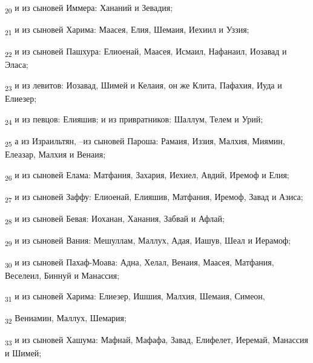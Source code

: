 \begin{tcolorbox}
\textsubscript{20} и из сыновей Иммера: Хананий и Зевадия;
\end{tcolorbox}
\begin{tcolorbox}
\textsubscript{21} и из сыновей Харима: Маасея, Елия, Шемаия, Иехиил и Уззия;
\end{tcolorbox}
\begin{tcolorbox}
\textsubscript{22} и из сыновей Пашхура: Елиоенай, Маасея, Исмаил, Нафанаил, Иозавад и Эласа;
\end{tcolorbox}
\begin{tcolorbox}
\textsubscript{23} и из левитов: Иозавад, Шимей и Келаия, он же Клита, Пафахия, Иуда и Елиезер;
\end{tcolorbox}
\begin{tcolorbox}
\textsubscript{24} и из певцов: Елияшив; и из привратников: Шаллум, Телем и Урий;
\end{tcolorbox}
\begin{tcolorbox}
\textsubscript{25} а из Израильтян, --из сыновей Пароша: Рамаия, Иззия, Малхия, Миямин, Елеазар, Малхия и Венаия;
\end{tcolorbox}
\begin{tcolorbox}
\textsubscript{26} и из сыновей Елама: Матфания, Захария, Иехиел, Авдий, Иремоф и Елия;
\end{tcolorbox}
\begin{tcolorbox}
\textsubscript{27} и из сыновей Заффу: Елиоенай, Елияшив, Матфания, Иремоф, Завад и Азиса;
\end{tcolorbox}
\begin{tcolorbox}
\textsubscript{28} и из сыновей Бевая: Иоханан, Ханания, Забвай и Афлай;
\end{tcolorbox}
\begin{tcolorbox}
\textsubscript{29} и из сыновей Вания: Мешуллам, Маллух, Адая, Иашув, Шеал и Иерамоф;
\end{tcolorbox}
\begin{tcolorbox}
\textsubscript{30} и из сыновей Пахаф-Моава: Адна, Хелал, Венаия, Маасея, Матфания, Веселеил, Биннуй и Манассия;
\end{tcolorbox}
\begin{tcolorbox}
\textsubscript{31} и из сыновей Харима: Елиезер, Ишшия, Малхия, Шемаия, Симеон,
\end{tcolorbox}
\begin{tcolorbox}
\textsubscript{32} Вениамин, Маллух, Шемария;
\end{tcolorbox}
\begin{tcolorbox}
\textsubscript{33} и из сыновей Хашума: Мафнай, Мафафа, Завад, Елифелет, Иеремай, Манассия и Шимей;
\end{tcolorbox}
